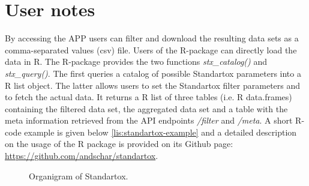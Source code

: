 \section{User notes}
By accessing the APP users can filter and download the resulting data sets as a comma-separated values (csv) file. Users of the R-package can directly load the data in R. The R-package provides the two functions \textit{stx\_catalog()} and \textit{stx\_query()}. The first queries a catalog of possible Standartox parameters into a R list object. The latter allows users to set the Standartox filter parameters and to fetch the actual data. It returns a R list of three tables (i.e. R data.frames) containing the filtered data set, the aggregated data set and a table with the meta information retrieved from the API endpoints \textit{/filter} and \textit{/meta}. A short R-code example is given below \ref{lis:standartox-example} and a detailed description on the usage of the R package is provided on its Github page: \url{https://github.com/andschar/standartox}.



\begin{figure}[h]
    
    \caption{Organigram of Standartox.}
    \label{fig:stx-organigram}
\end{figure}


